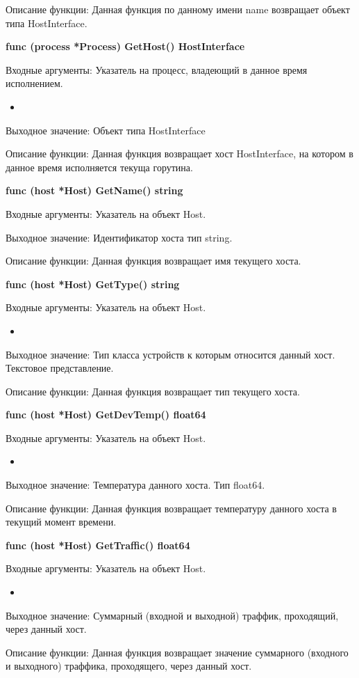 Описание функции: Данная функция по данному имени name возвращает объект типа HostInterface.


\textbf{func (process *Process) GetHost() HostInterface }

Входные аргументы: Указатель на процесс, владеющий в данное время исполнением.
\begin{itemize}
	\item 
\end{itemize}
Выходное значение: Объект типа HostInterface

Описание функции: Данная функция возвращает хост HostInterface, на котором в данное время исполняется текуща горутина. 

\textbf{func (host *Host) GetName() string }

Входные аргументы: Указатель на объект Host.

Выходное значение: Идентификатор хоста тип string.

Описание функции: Данная функция возвращает имя текущего хоста.


\textbf{func (host *Host) GetType() string }

Входные аргументы: Указатель на объект Host.
\begin{itemize}
	\item 
\end{itemize}
Выходное значение: Тип класса устройств к которым относится данный хост. Текстовое представление.

Описание функции: Данная функция возвращает тип текущего хоста.


\textbf{func (host *Host) GetDevTemp() float64 }

Входные аргументы: Указатель на объект Host.
\begin{itemize}
	\item 
\end{itemize}
Выходное значение: Температура данного хоста. Тип float64.

Описание функции: Данная функция возвращает температуру данного хоста в текущий момент времени.


\textbf{func (host *Host) GetTraffic() float64}

Входные аргументы: Указатель на объект Host.
\begin{itemize}
	\item 
\end{itemize}
Выходное значение: Суммарный (входной и выходной) траффик, проходящий, через данный хост. 

Описание функции: Данная функция возвращает значение суммарного (входного и выходного) траффика, проходящего, через данный хост.


